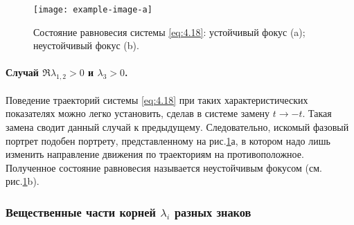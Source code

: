 \begin{figure}[h!]
        \centering
        \texttt{[image: example-image-a]}
        \caption{Состояние равновесия системы \eqref{eq:4.18}: устойчивый фокус (a); 
        неустойчивый фокус (b).}
        \label{fig:4.4}
\end{figure}

\paragraph{Случай $\Re \lambda_{1,2}>0$ и $\lambda_3>0$.}%
\label{par:sluchai_re_1,2_0_i_lambda_3_0_}

Поведение траекторий системы \eqref{eq:4.18} при таких характеристических показателях можно легко установить, сделав в системе замену $t \to - t$. Такая замена сводит данный случай к предыдущему.
Следовательно, искомый фазовый портрет подобен портрету, представленному на рис.\ref{fig:4.4}а, в котором надо лишь изменить направление движения по траекториям на противоположное. Полученное состояние равновесия называется неустойчивым фокусом (см. рис.\ref{fig:4.4}b).

\subsubsection{Вещественные части корней $\lambda_i$ разных знаков}%
\label{ssub:veshchestvennye_chasti_kornei_lambda_i_raznykh_znakov}



